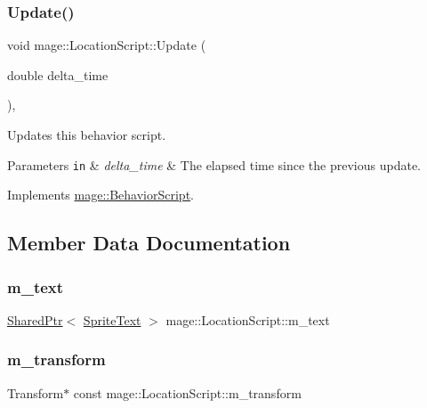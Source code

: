 \subsubsection{\texorpdfstring{Update()}{Update()}}
{\footnotesize\ttfamily void mage\+::\+Location\+Script\+::\+Update (\begin{DoxyParamCaption}\item[{double}]{delta\+\_\+time }\end{DoxyParamCaption})\hspace{0.3cm}{\ttfamily [override]}, {\ttfamily [virtual]}}

Updates this behavior script.


\begin{DoxyParams}[1]{Parameters}
\mbox{\tt in}  & {\em delta\+\_\+time} & The elapsed time since the previous update. \\
\hline
\end{DoxyParams}


Implements \hyperlink{classmage_1_1_behavior_script_a905b6c83640cb91d19fecab3435f6feb}{mage\+::\+Behavior\+Script}.



\subsection{Member Data Documentation}
\hypertarget{classmage_1_1_location_script_ac5c7ada3b364d85888686abf20cd6463}{}\label{classmage_1_1_location_script_ac5c7ada3b364d85888686abf20cd6463} 
\subsubsection{\texorpdfstring{m\+\_\+text}{m\_text}}
{\footnotesize\ttfamily \hyperlink{namespacemage_a1e01ae66713838a7a67d30e44c67703e}{Shared\+Ptr}$<$ \hyperlink{classmage_1_1_sprite_text}{Sprite\+Text} $>$ mage\+::\+Location\+Script\+::m\+\_\+text\hspace{0.3cm}{\ttfamily [private]}}

\hypertarget{classmage_1_1_location_script_aaa349c73ef4fc8267e6bd1cc0512cd5c}{}\label{classmage_1_1_location_script_aaa349c73ef4fc8267e6bd1cc0512cd5c} 
\subsubsection{\texorpdfstring{m\+\_\+transform}{m\_transform}}
{\footnotesize\ttfamily Transform$\ast$ const mage\+::\+Location\+Script\+::m\+\_\+transform\hspace{0.3cm}{\ttfamily [private]}}

